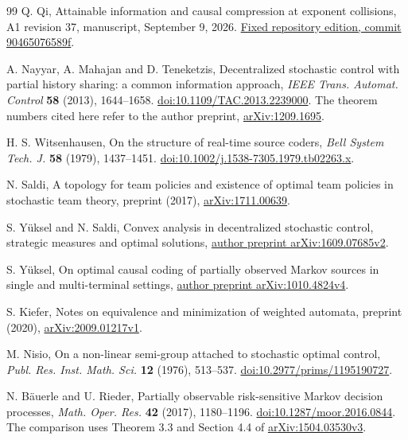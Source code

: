 \begin{thebibliography}{99}
Q. Qi, Attainable information and causal compression at exponent
collisions, A1 revision 37, manuscript, September 9, 2026.
\href{https://github.com/TrillionniumFoundation/theta-theory/tree/90465076589f5e5c69227d624f278c47744f1c1d}{Fixed repository edition, commit 90465076589f}.


A. Nayyar, A. Mahajan and D. Teneketzis,
Decentralized stochastic control with partial history sharing:
a common information approach,
\emph{IEEE Trans. Automat. Control} \textbf{58} (2013), 1644--1658.
\href{https://doi.org/10.1109/TAC.2013.2239000}{doi:10.1109/TAC.2013.2239000}.
The theorem numbers cited here refer to the author preprint,
\href{https://arxiv.org/abs/1209.1695}{arXiv:1209.1695}.

H. S. Witsenhausen, On the structure of real-time source coders,
\emph{Bell System Tech. J.} \textbf{58} (1979), 1437--1451.
\href{https://doi.org/10.1002/j.1538-7305.1979.tb02263.x}{doi:10.1002/j.1538-7305.1979.tb02263.x}.


N. Saldi, A topology for team policies and existence of optimal team
policies in stochastic team theory, preprint (2017),
\href{https://arxiv.org/abs/1711.00639}{arXiv:1711.00639}.

S. Y\"uksel and N. Saldi, Convex analysis in decentralized stochastic
control, strategic measures and optimal solutions,
\href{https://arxiv.org/abs/1609.07685v2}{author preprint arXiv:1609.07685v2}.

S. Y\"uksel, On optimal causal coding of partially observed Markov
sources in single and multi-terminal settings,
\href{https://arxiv.org/abs/1010.4824v4}{author preprint arXiv:1010.4824v4}.

S. Kiefer, Notes on equivalence and minimization of weighted automata,
preprint (2020),
\href{https://arxiv.org/abs/2009.01217v1}{arXiv:2009.01217v1}.

M. Nisio, On a non-linear semi-group attached to stochastic optimal
control, \emph{Publ. Res. Inst. Math. Sci.} \textbf{12} (1976), 513--537.
\href{https://doi.org/10.2977/prims/1195190727}{doi:10.2977/prims/1195190727}.

N. B\"auerle and U. Rieder, Partially observable risk-sensitive Markov
decision processes, \emph{Math. Oper. Res.} \textbf{42} (2017), 1180--1196.
\href{https://doi.org/10.1287/moor.2016.0844}{doi:10.1287/moor.2016.0844}.
The comparison uses Theorem 3.3 and Section 4.4 of
\href{https://arxiv.org/abs/1504.03530v3}{arXiv:1504.03530v3}.


\end{thebibliography}
